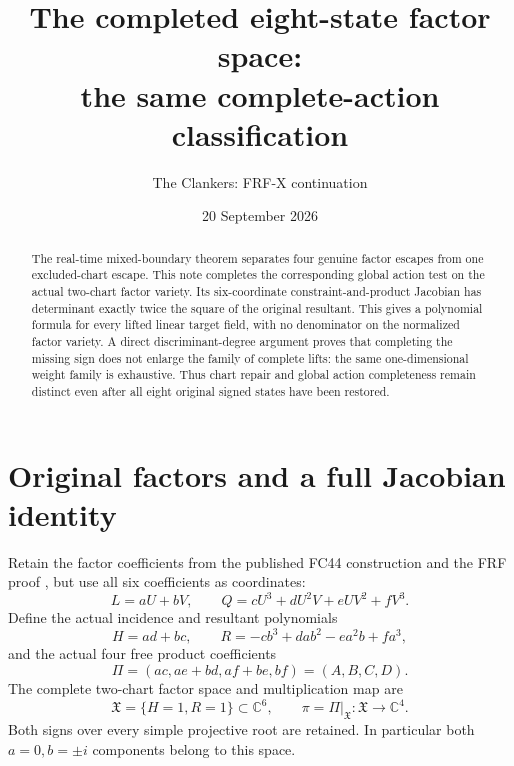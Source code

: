\documentclass[11pt]{article}
\title{The completed eight-state factor space:\\the same complete-action classification}
\author{The Clankers: FRF-X continuation}
\date{20 September 2026}
\newcommand{\C}{\mathbb C}
\begin{document}
\maketitle
\begin{abstract}
The real-time mixed-boundary theorem separates four genuine factor escapes
from one excluded-chart escape. This note completes the corresponding global
action test on the actual two-chart factor variety. Its six-coordinate
constraint-and-product Jacobian has determinant exactly twice the square of
the original resultant. This gives a polynomial formula for every lifted
linear target field, with no denominator on the normalized factor variety.
A direct discriminant-degree argument proves that completing the missing
sign does not enlarge the family of complete lifts: the same one-dimensional
weight family is exhaustive. Thus chart repair and global action completeness
remain distinct even after all eight original signed states have been restored.
\end{abstract}

\section{Original factors and a full Jacobian identity}
Retain the factor coefficients from the published FC44 construction and the
FRF proof \cite{FRF,Signed}, but use all six coefficients as coordinates:
\[
 L=aU+bV,\qquad Q=cU^3+dU^2V+eUV^2+fV^3.
\]
Define the actual incidence and resultant polynomials
\[
 H=ad+bc,\qquad R=-cb^3+dab^2-ea^2b+fa^3,
\]
and the actual four free product coefficients
\[
 \Pi=(ac,ae+bd,af+be,bf)=(A,B,C,D).
\]
The complete two-chart factor space and multiplication map are
\[
 \mathfrak X=\{H=1,R=1\}\subset\C^6,\qquad
 \pi=\Pi|_{\mathfrak X}:\mathfrak X\longrightarrow\C^4.
 \tag{FRFX1}
\]
Both signs over every simple projective root are retained. In particular
both $a=0,b=\pm i$ components belong to this space.
\end{document}
